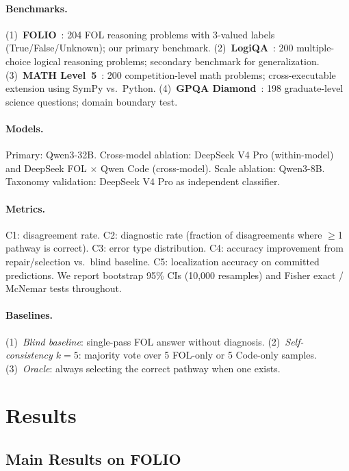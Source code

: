 \documentclass[11pt,a4paper]{article}
\begin{document}
\paragraph{Benchmarks.}
(1)~\textbf{FOLIO}~\cite{han2022folio}: 204 FOL reasoning problems with 3-valued labels (True/False/Unknown); our primary benchmark.
(2)~\textbf{LogiQA}~\cite{liu2021logiqa}: 200 multiple-choice logical reasoning problems; secondary benchmark for generalization.
(3)~\textbf{MATH Level~5}~\cite{hendrycks2021math}: 200 competition-level math problems; cross-executable extension using SymPy vs.\ Python.
(4)~\textbf{GPQA Diamond}~\cite{rein2024gpqa}: 198 graduate-level science questions; domain boundary test.

\paragraph{Models.}
Primary: Qwen3-32B.
Cross-model ablation: DeepSeek V4 Pro (within-model) and DeepSeek FOL $\times$ Qwen Code (cross-model).
Scale ablation: Qwen3-8B.
Taxonomy validation: DeepSeek V4 Pro as independent classifier.

\paragraph{Metrics.}
C1: disagreement rate.
C2: diagnostic rate (fraction of disagreements where $\geq$1 pathway is correct).
C3: error type distribution.
C4: accuracy improvement from repair/selection vs.\ blind baseline.
C5: localization accuracy on committed predictions.
We report bootstrap 95\% CIs (10{,}000 resamples) and Fisher exact / McNemar tests throughout.

\paragraph{Baselines.}
(1)~\emph{Blind baseline}: single-pass FOL answer without diagnosis.
(2)~\emph{Self-consistency $k{=}5$}: majority vote over 5 FOL-only or 5 Code-only samples.
(3)~\emph{Oracle}: always selecting the correct pathway when one exists.

\section{Results}

\subsection{Main Results on FOLIO}
\label{sec:main-results}
\end{document}
